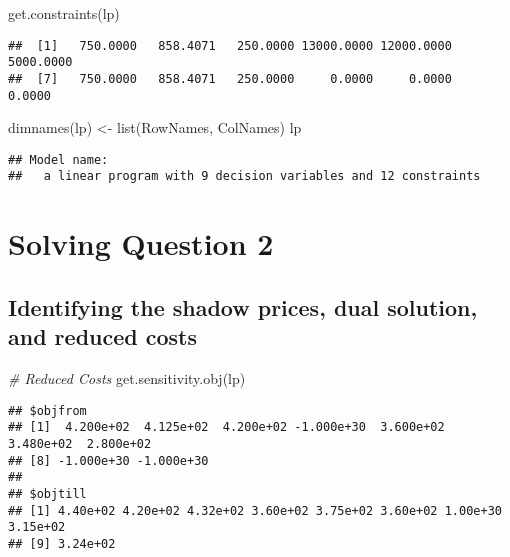\documentclass[
]{article}
\newenvironment{Shaded}{\begin{snugshade}}{\end{snugshade}}
\newcommand{\CommentTok}[1]{\textcolor[rgb]{0.56,0.35,0.01}{\textit{#1}}}
\newcommand{\FunctionTok}[1]{\textcolor[rgb]{0.00,0.00,0.00}{#1}}
\newcommand{\NormalTok}[1]{#1}
\newcommand{\OtherTok}[1]{\textcolor[rgb]{0.56,0.35,0.01}{#1}}
\begin{document}
\begin{Shaded}
\begin{Highlighting}[]
\FunctionTok{get.constraints}\NormalTok{(lp)}
\end{Highlighting}
\end{Shaded}

\begin{verbatim}
##  [1]   750.0000   858.4071   250.0000 13000.0000 12000.0000  5000.0000
##  [7]   750.0000   858.4071   250.0000     0.0000     0.0000     0.0000
\end{verbatim}

\begin{Shaded}
\begin{Highlighting}[]
\FunctionTok{dimnames}\NormalTok{(lp) }\OtherTok{\textless{}{-}} \FunctionTok{list}\NormalTok{(RowNames, ColNames)}
\NormalTok{lp}
\end{Highlighting}
\end{Shaded}

\begin{verbatim}
## Model name: 
##   a linear program with 9 decision variables and 12 constraints
\end{verbatim}

\hypertarget{solving-question-2}{%
\section{Solving Question 2}\label{solving-question-2}}

\hypertarget{identifying-the-shadow-prices-dual-solution-and-reduced-costs}{%
\subsection{Identifying the shadow prices, dual solution, and reduced
costs}\label{identifying-the-shadow-prices-dual-solution-and-reduced-costs}}

\begin{Shaded}
\begin{Highlighting}[]
\CommentTok{\# Reduced Costs}
\FunctionTok{get.sensitivity.obj}\NormalTok{(lp)}
\end{Highlighting}
\end{Shaded}

\begin{verbatim}
## $objfrom
## [1]  4.200e+02  4.125e+02  4.200e+02 -1.000e+30  3.600e+02  3.480e+02  2.800e+02
## [8] -1.000e+30 -1.000e+30
## 
## $objtill
## [1] 4.40e+02 4.20e+02 4.32e+02 3.60e+02 3.75e+02 3.60e+02 1.00e+30 3.15e+02
## [9] 3.24e+02
\end{verbatim}
\end{document}
